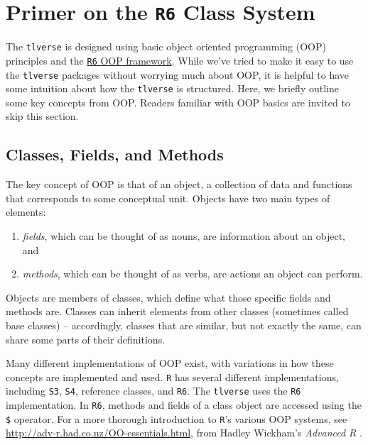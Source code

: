 \documentclass[
  12pt, krantz2,
]{krantz}
\newcommand{\passthrough}[1]{#1}
\providecommand{\tightlist}{%
  \setlength{\itemsep}{0pt}\setlength{\parskip}{0pt}}
\newcommand{\1}{\mathbbm{1}}
\theoremstyle{definition}
\theoremstyle{definition}
\theoremstyle{definition}
\theoremstyle{definition}
\theoremstyle{remark}
\begin{document}
\hypertarget{primer-on-the-r6-class-system}{%
\section{\texorpdfstring{Primer on the \texttt{R6} Class System}{Primer on the R6 Class System}}\label{primer-on-the-r6-class-system}}

The \passthrough{\lstinline!tlverse!} is designed using basic object oriented programming (OOP)
principles and the \href{https://adv-r.hadley.nz/r6.html}{\passthrough{\lstinline!R6!} OOP framework}. While
we've tried to make it easy to use the \passthrough{\lstinline!tlverse!} packages without worrying much
about OOP, it is helpful to have some intuition about how the \passthrough{\lstinline!tlverse!} is
structured. Here, we briefly outline some key concepts from OOP. Readers
familiar with OOP basics are invited to skip this section.

\hypertarget{classes-fields-and-methods}{%
\subsection{Classes, Fields, and Methods}\label{classes-fields-and-methods}}

The key concept of OOP is that of an object, a collection of data and functions
that corresponds to some conceptual unit. Objects have two main types of
elements:

\begin{enumerate}
\def\labelenumi{\arabic{enumi}.}
\tightlist
\item
  \emph{fields}, which can be thought of as nouns, are information about an object,
  and
\item
  \emph{methods}, which can be thought of as verbs, are actions an object can
  perform.
\end{enumerate}

Objects are members of classes, which define what those specific fields and
methods are. Classes can inherit elements from other classes (sometimes called
base classes) -- accordingly, classes that are similar, but not exactly the
same, can share some parts of their definitions.

Many different implementations of OOP exist, with variations in how these
concepts are implemented and used. \passthrough{\lstinline!R!} has several different implementations,
including \passthrough{\lstinline!S3!}, \passthrough{\lstinline!S4!}, reference classes, and \passthrough{\lstinline!R6!}. The \passthrough{\lstinline!tlverse!} uses the \passthrough{\lstinline!R6!}
implementation. In \passthrough{\lstinline!R6!}, methods and fields of a class object are accessed using
the \passthrough{\lstinline!$!} operator. For a more thorough introduction to \passthrough{\lstinline!R!}'s various OOP systems,
see \url{http://adv-r.had.co.nz/OO-essentials.html}, from Hadley Wickham's \emph{Advanced
R} \citep{wickham2014advanced}.
\end{document}

